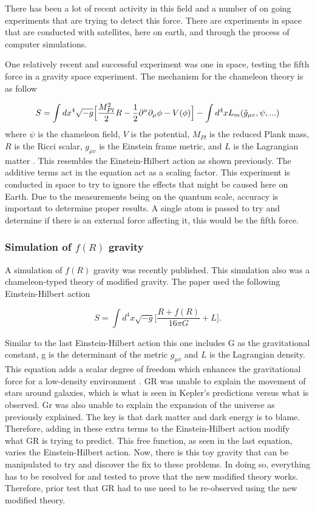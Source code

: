\documentclass[a4paper]{article}
\begin{document}
There has been a lot of recent activity in this field and a number of on going experiments that are trying to detect this force. There are experiments in space that are conducted with satellites, here on earth, and through the process of computer simulations.

One relatively recent and successful experiment was one in space, testing the fifth force in a gravity space experiment. The mechanism for the chameleon theory is as follow

$$
S = \int dx^{4}\sqrt{-g}\Big[\frac{M^{2}_{Pl}}{2}R - \frac{1}{2}\partial^u \partial_{\mu}\phi - V(\phi)\Big] - \int d^{4}xL_{m}(\Tilde{g}_{\mu v}, \psi, ...)
$$
where $\psi$ is the chameleon field, $V$ is the potential, $M_{Pl}$ is the reduced Plank mass, $R$ is the Ricci scalar, $g_{\mu v}$ is the Einstein frame metric, and $L$ is the Lagrangian matter \cite{Pernot_Borr_s_2019}. This resembles the Einstein-Hilbert action as shown previously. The additive terms act in the equation act as a scaling factor. This experiment is conducted in space to try to ignore the effects that might be caused here on Earth. Due to the measurements being on the quantum scale, accuracy is important to determine proper results. A single atom is passed to try and determine if there is an external force affecting it, this would be the fifth force.

\subsubsection{Simulation of $f(R)$ gravity}

A simulation of $f(R)$ gravity was recently published. This simulation also was a chameleon-typed theory of modified gravity. The paper used the following Einstein-Hilbert action

$$
S = \int d^{4}x\sqrt{-g}\Big[\frac{R + f(R)}{16\pi G} + L \Big].
$$


Similar to the last Einstein-Hilbert action this one includes G as the gravitational constant, g is the determinant of the metric $g_{\mu v}$ and $L$ is the Lagrangian density. This equation adds a scalar degree of freedom which enhances the gravitational force for a low-density environment \cite{Arnold_2019}. GR was unable to explain the movement of stars around galaxies, which is what is seen in Kepler's predictions versus what is observed. Gr was also unable to explain the expansion of the universe as previously explained. The key is that dark matter and dark energy is to blame. Therefore, adding in these extra terms to the Einstein-Hilbert action modify what GR is trying to predict. This free function, as seen in the last equation, varies the Einstein-Hilbert action. Now, there is this toy gravity that can be manipulated to try and discover the fix to these problems. In doing so, everything has to be resolved for and tested to prove that the new modified theory works. Therefore, prior test that GR had to use need to be re-observed using the new modified theory. 
\end{document}
